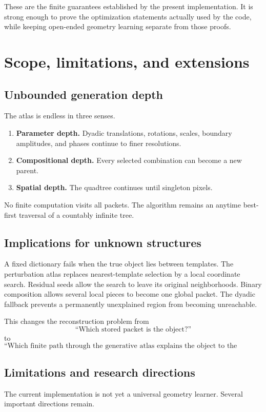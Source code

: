 \documentclass[11pt]{article}
\theoremstyle{definition}
\theoremstyle{remark}
\begin{document}
These are the finite guarantees established by the present implementation. It is strong enough to prove the optimization statements actually used by the code, while keeping open-ended geometry learning separate from those proofs.

\FloatBarrier
\FloatBarrier
\section{Scope, limitations, and extensions}
\subsection{Unbounded generation depth}
The atlas is endless in three senses.

\begin{enumerate}
\item \textbf{Parameter depth.} Dyadic translations, rotations, scales, boundary amplitudes, and phases continue to finer resolutions.
\item \textbf{Compositional depth.} Every selected combination can become a new parent.
\item \textbf{Spatial depth.} The quadtree continues until singleton pixels.
\end{enumerate}

No finite computation visits all packets. The algorithm remains an anytime best-first traversal of a countably infinite tree.

\FloatBarrier
\subsection{Implications for unknown structures}
A fixed dictionary fails when the true object lies between templates. The perturbation atlas replaces nearest-template selection by a local coordinate search. Residual seeds allow the search to leave its original neighborhoods. Binary composition allows several local pieces to become one global packet. The dyadic fallback prevents a permanently unexplained region from becoming unreachable.

This changes the reconstruction problem from
\[
\text{``Which stored packet is the object?''}
\]
to
\[
\boxed{
\text{``Which finite path through the generative atlas explains the object to the required tolerance?''}
}
\]

\FloatBarrier
\subsection{Limitations and research directions}
The current implementation is not yet a universal geometry learner. Several important directions remain.
\end{document}
